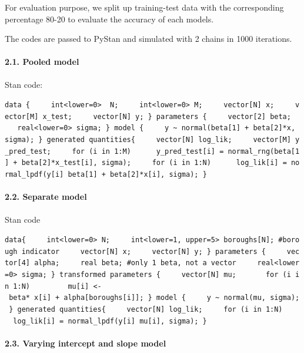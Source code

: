 \documentclass[11pt]{article}
\begin{document}
For evaluation purpose, we split up training-test data with the
corresponding percentage 80-20 to evaluate the accuracy of each models.

The codes are passed to PyStan and simulated with 2 chains in 1000
iterations.

\paragraph{2.1. Pooled model}\label{pooled-model}

Stan code:

    \texttt{data\ \{\ \ \ \ \ int\textless{}lower=0\textgreater{}\ \ N;\ \ \ \ \ int\textless{}lower=0\textgreater{}\ M;\ \ \ \ \ vector{[}N{]}\ x;\ \ \ \ \ vector{[}M{]}\ x\_test;\ \ \ \ \ vector{[}N{]}\ y;\ \}\ parameters\ \{\ \ \ \ \ vector{[}2{]}\ beta;\ \ \ \ \ real\textless{}lower=0\textgreater{}\ sigma;\ \}\ model\ \{\ \ \ \ \ y\ \textasciitilde{}\ normal(beta{[}1{]}\ +\ beta{[}2{]}*x,\ sigma);\ \}\ generated\ quantities\{\ \ \ \ \ vector{[}N{]}\ log\_lik;\ \ \ \ \ vector{[}M{]}\ y\_pred\_test;\ \ \ \ \ for\ (i\ in\ 1:M)\ \ \ \ \ \ y\_pred\_test{[}i{]}\ =\ normal\_rng(beta{[}1{]}\ +\ beta{[}2{]}*x\_test{[}i{]},\ sigma);\ \ \ \ \ for\ (i\ in\ 1:N)\ \ \ \ \ \ log\_lik{[}i{]}\ =\ normal\_lpdf(y{[}i{]}\textbar{}\ beta{[}1{]}\ +\ beta{[}2{]}*x{[}i{]},\ sigma);\ \}}

    \paragraph{2.2. Separate model}\label{separate-model}

Stan code

    \texttt{data\{\ \ \ \ \ int\textless{}lower=0\textgreater{}\ N;\ \ \ \ \ int\textless{}lower=1,\ upper=5\textgreater{}\ boroughs{[}N{]};\ \#borough\ indicator\ \ \ \ \ vector{[}N{]}\ x;\ \ \ \ \ vector{[}N{]}\ y;\ \}\ parameters\ \{\ \ \ \ \ vector{[}4{]}\ alpha;\ \ \ \ \ real\ beta;\ \#only\ 1\ beta,\ not\ a\ vector\ \ \ \ \ real\textless{}lower=0\textgreater{}\ sigma;\ \}\ transformed\ parameters\ \{\ \ \ \ \ vector{[}N{]}\ mu;\ \ \ \ \ \ \ for\ (i\ in\ 1:N)\ \ \ \ \ \ \ \ \ mu{[}i{]}\ \textless{}-\ beta*\ x{[}i{]}\ +\ alpha{[}boroughs{[}i{]}{]};\ \}\ model\ \{\ \ \ \ \ y\ \textasciitilde{}\ normal(mu,\ sigma);\ \}\ generated\ quantities\{\ \ \ \ \ vector{[}N{]}\ log\_lik;\ \ \ \ \ for\ (i\ in\ 1:N)\ \ \ \ \ \ log\_lik{[}i{]}\ =\ normal\_lpdf(y{[}i{]}\textbar{}\ mu{[}i{]},\ sigma);\ \}}

    \paragraph{2.3. Varying intercept and slope
model}\label{varying-intercept-and-slope-model}
\end{document}
